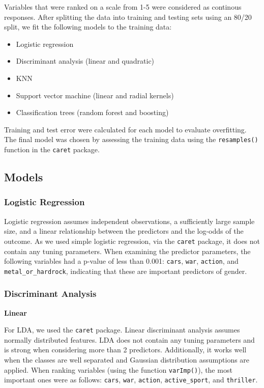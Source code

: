 \documentclass[]{article}
\providecommand{\tightlist}{%
  \setlength{\itemsep}{0pt}\setlength{\parskip}{0pt}}
\begin{document}
Variables that were ranked on a scale from 1-5 were considered as
continous responses. After splitting the data into training and testing
sets using an 80/20 split, we fit the following models to the training
data:

\begin{itemize}
\tightlist
\item
  Logistic regression
\item
  Discriminant analysis (linear and quadratic)
\item
  KNN
\item
  Support vector machine (linear and radial kernels)
\item
  Classification trees (random forest and boosting)
\end{itemize}

Training and test error were calculated for each model to evaluate
overfitting. The final model was chosen by assessing the training data
using the \texttt{resamples()} function in the \texttt{caret} package.

\subsection{Models}\label{models}

\subsubsection{Logistic Regression}\label{logistic-regression}

Logistic regression assumes independent observations, a sufficiently
large sample size, and a linear relationship between the predictors and
the log-odds of the outcome. As we used simple logistic regression, via
the \texttt{caret} package, it does not contain any tuning parameters.
When examining the predictor parameters, the following variables had a
p-value of less than 0.001: \texttt{cars}, \texttt{war},
\texttt{action}, and \texttt{metal\_or\_hardrock}, indicating that these
are important predictors of gender.

\subsubsection{Discriminant Analysis}\label{discriminant-analysis}

\textbf{Linear}

For LDA, we used the \texttt{caret} package. Linear discriminant
analysis assumes normally distributed features. LDA does not contain any
tuning parameters and is strong when considering more than 2 predictors.
Additionally, it works well when the classes are well separated and
Gaussian distribution assumptions are applied. When ranking variables
(using the function \texttt{varImp()}), the most important ones were as
follows: \texttt{cars}, \texttt{war}, \texttt{action},
\texttt{active\_sport}, and \texttt{thriller}.
\end{document}
